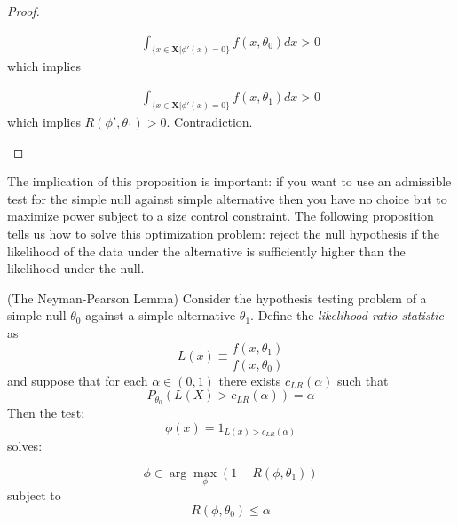 \documentclass[11pt]{article} %
\begin{document}
\begin{proof}
\begin{enumerate}
\begin{align*}
\int_{\{x \in \textbf{X} | \phi'(x)=0 \}} f(x,\theta_0) dx > 0
\end{align*}
which implies

\begin{align*}
\int_{\{x \in \textbf{X} | \phi'(x)=0 \}} f(x,\theta_1) dx > 0
\end{align*}
which implies $R(\phi',\theta_1)>0$. Contradiction.

\end{enumerate}

\end{proof}


The implication of this proposition is important: if you want to use an admissible test for the simple null against simple alternative then you have no choice but to maximize power subject to a size control constraint. The following proposition tells us how to solve this optimization problem: reject the null hypothesis if the likelihood of the data under the alternative is sufficiently higher than the likelihood under the null. 



\begin{proposition} (The Neyman-Pearson Lemma) Consider the  hypothesis testing problem of a simple null $\theta_0$ against a simple alternative $\theta_1$. Define the \emph{likelihood ratio statistic} as
\begin{equation*}
L(x) \equiv \frac{f(x, \theta_1)}{f(x, \theta_0)}
\end{equation*}
and suppose that for each $\alpha \in (0,1)$ there exists $c_{LR}(\alpha)$ such that
\begin{equation*}
P_{\theta_0} (L(X)>c_{LR}(\alpha))=\alpha
\end{equation*}
Then the test:
\begin{equation} \label{equation:NPtest}
\phi(x)= 1_{L(x)>c_{LR}(\alpha)}
\end{equation}
solves:

\begin{equation*}
\phi \in \arg \max_{\phi} (1-R(\phi, \theta_1) )
\end{equation*}
\noindent subject to 
$$R(\phi,\theta_0) \leq \alpha $$

\end{proposition}
\end{document}
